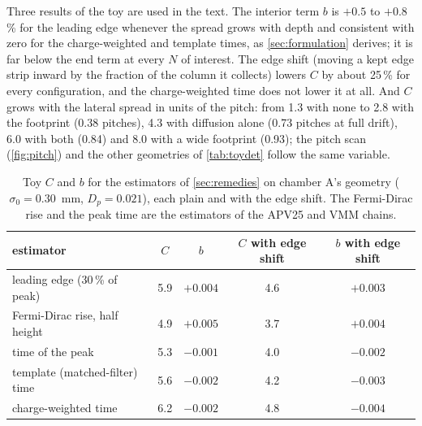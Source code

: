 Three results of the toy are used in the text. The interior term $b$ is $+0.5$ to $+0.8$\,\% for the leading edge whenever the
spread grows with depth and consistent with zero for the charge-weighted and template times, as \cref{sec:formulation} derives;
it is far below the end term at every $N$ of interest. The edge shift (moving a kept edge strip inward by the fraction of the
column it collects) lowers $C$ by about 25\,\% for every configuration, and the charge-weighted time does not lower it at all.
And $C$ grows with the lateral spread in units of the pitch: from 1.3 with none to 2.8 with the footprint (0.38 pitches), 4.3
with diffusion alone (0.73 pitches at full drift), 6.0 with both (0.84) and 8.0 with a wide footprint (0.93); the pitch scan
(\cref{fig:pitch}) and the other geometries of \cref{tab:toydet} follow the same variable.

\begin{table}[h]
  \centering\small
  \caption{Toy $C$ and $b$ for the estimators of \cref{sec:remedies} on chamber A's geometry ($\sigma_0 = 0.30$~mm, $D_p =
  0.021$), each plain and with the edge shift. The Fermi-Dirac rise and the peak time are the estimators of the APV25 and VMM
  chains.}
  \label{tab:estimators}
  \begin{tabular}{@{}lcccc@{}}
    \toprule
    estimator & $C$ & $b$ & $C$ with edge shift & $b$ with edge shift \\
    \midrule
    leading edge (30\,\% of peak) & 5.9 & $+0.004$ & 4.6 & $+0.003$ \\
    Fermi-Dirac rise, half height & 4.9 & $+0.005$ & 3.7 & $+0.004$ \\
    time of the peak & 5.3 & $-0.001$ & 4.0 & $-0.002$ \\
    template (matched-filter) time & 5.6 & $-0.002$ & 4.2 & $-0.003$ \\
    charge-weighted time & 6.2 & $-0.002$ & 4.8 & $-0.004$ \\
    \bottomrule
  \end{tabular}
\end{table}

